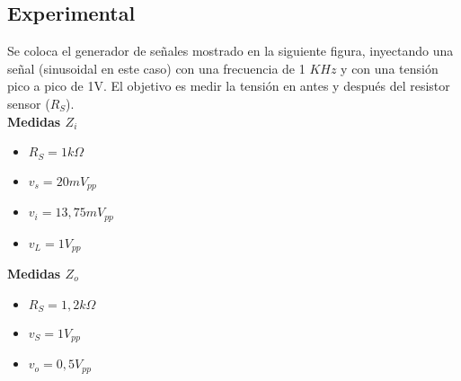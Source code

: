 \begin{multicols}{2}
    \subsection{Experimental}
    \sangria{} Se coloca el generador de señales mostrado en la siguiente figura, inyectando una señal (sinusoidal en este caso) con una frecuencia de 1 $KHz$ y con una tensión pico a pico de 1V. El objetivo es medir la tensión en antes y después del resistor sensor ($R_S$).\\
    \textbf{Medidas $Z_i$}
    \begin{itemize}[nosep]
        \item $R_S = 1k \Omega$
        \item $v_s = 20mV_{pp}$
        \item $v_i = 13,75 mV_{pp}$
        \item $v_L = 1V_{pp}$
    \end{itemize}
\begin{minipage}[t]{\linewidth}
    \textbf{Medidas $Z_o$}
    \begin{itemize}[nosep]
        \item $R_S = 1,2k\Omega$
        \item $v_S = 1V_{pp}$
        \item $v_o = 0,5 V_{pp}$
    \end{itemize}
\end{minipage}
\end{multicols}
